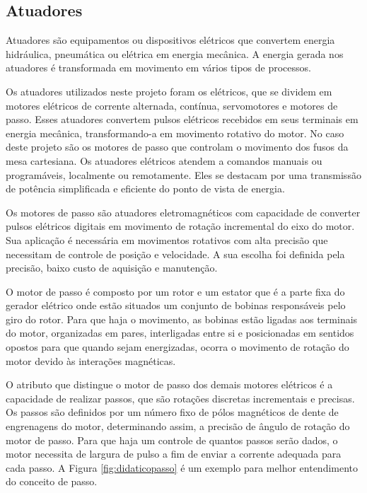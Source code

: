 \subsection{Atuadores}\label{subsec:metatuadores}

Atuadores são equipamentos ou dispositivos elétricos que convertem energia hidráulica, pneumática 
ou elétrica em energia mecânica. A energia gerada nos atuadores é transformada em movimento em 
vários tipos de processos.

Os atuadores utilizados neste projeto foram os elétricos, que se dividem em motores elétricos de 
corrente alternada, contínua, servomotores e motores de passo. Esses atuadores convertem pulsos 
elétricos recebidos em seus terminais em energia mecânica, transformando-a em movimento rotativo 
do motor. No caso deste projeto são os motores de passo que controlam o movimento dos fusos da mesa 
cartesiana. Os atuadores elétricos atendem a comandos manuais ou programáveis, localmente ou remotamente. 
Eles se destacam por uma transmissão de potência simplificada e eficiente do ponto de vista de energia.

Os motores de passo são atuadores eletromagnéticos com capacidade de converter pulsos elétricos digitais 
em movimento de rotação incremental do eixo do motor. Sua aplicação é necessária em movimentos 
rotativos com alta precisão que necessitam de controle de posição e velocidade. A sua escolha foi definida 
pela precisão, baixo custo de aquisição e manutenção.

O motor de passo é composto por um rotor e um estator que é a parte fixa do gerador 
elétrico onde estão situados um conjunto de bobinas responsáveis pelo giro do rotor. 
Para que haja o movimento, as bobinas estão ligadas aos terminais do motor, organizadas em pares, 
interligadas entre si e posicionadas em sentidos opostos para que quando sejam energizadas, 
ocorra o movimento de rotação do motor devido às interações magnéticas.

O atributo que distingue o motor de passo dos demais motores elétricos é a capacidade de realizar passos, 
que são rotações discretas incrementais e precisas. Os passos são definidos por um número fixo de 
pólos magnéticos de dente de engrenagens do motor, determinando assim, a precisão de ângulo de rotação 
do motor de passo. Para que haja um controle de quantos passos serão dados, o motor necessita de 
largura de pulso a fim de enviar a corrente adequada para cada passo. A Figura \ref{fig:didaticopasso} 
é um exemplo para melhor entendimento do conceito de passo.

